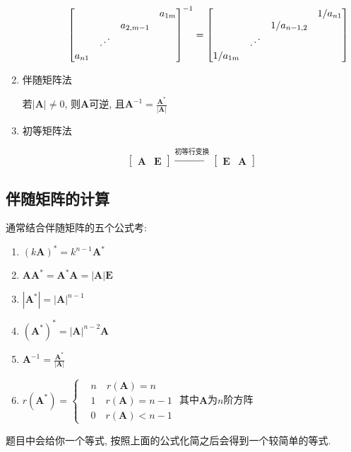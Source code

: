 \begin{enumerate}
\begin{enumerate}
\begin{enumerate}
\begin{equation*}
\begin{bmatrix}
& & & a_{1m} \\
& & a_{2,m-1} & \\
& \reflectbox{$\ddots$} & & \\
a_{n1} & & &
\end{bmatrix}^{-1}=
\begin{bmatrix}
& & & 1/a_{n1} \\
& & 1/a_{n-1,2} & \\
& \reflectbox{$\ddots$} & & \\
1/a_{1m}& & &
\end{bmatrix}
\end{equation*}
\end{enumerate}
\end{enumerate}
\item 伴随矩阵法 \par
若$ |\bm{A}|\neq 0 $, 则$ \bm{A} $可逆, 且$ \bm{A}^{-1}=\frac{\bm{A}^{*}}{|\bm{A}|} $
\item 初等矩阵法 \par
\begin{equation*}
\begin{bmatrix}
\bm{A} & \bm{E}
\end{bmatrix}\xrightarrow{\text{初等行变换}}
\begin{bmatrix}
\bm{E} & \bm{A}
\end{bmatrix}
\end{equation*}
\end{enumerate}
\subsection{伴随矩阵的计算}
通常结合伴随矩阵的五个公式考:
\begin{enumerate}
\item $ (k \bm{A})^{*}=k^{n-1}\bm{A}^{*} $
\item $ \bm{A}\bm{A}^{*}=\bm{A}^{*}\bm{A}=|\bm{A}|\bm{E} $
\item $ |\bm{A}^{*}|=|\bm{A}|^{n-1} $
\item $ (\bm{A}^{*})^{*}=|\bm{A}|^{n-2}\bm{A} $
\item $ \bm{A}^{-1}=\frac{\bm{A}^{*}}{|\bm{A}|} $
\item $ r(\bm{A}^{*})=\left\{
\begin{aligned}
& n\quad r(\bm{A})=n \\
& 1\quad r(\bm{A})=n-1 \\
& 0\quad r(\bm{A})<n-1
\end{aligned}\right.$ 其中$ \bm{A} $为$ n $阶方阵
\end{enumerate}\par
题目中会给你一个等式, 按照上面的公式化简之后会得到一个较简单的等式.

